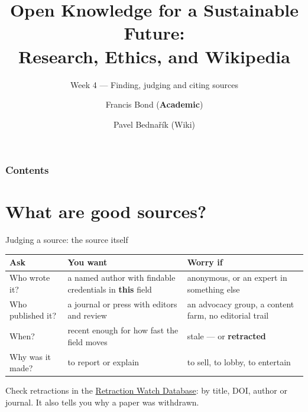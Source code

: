 \documentclass[aspectratio=169]{beamer}
\title[Sources]{Open Knowledge for a Sustainable Future:\\ Research, Ethics, and Wikipedia}
\subtitle{Week 4 --- Finding, judging and citing sources}
\author[Bond \& Bednařík]{Francis Bond (\textbf{Academic}) \and Pavel Bednařík (Wiki)}
\institute[UPOL \& Wikimedia]{Palacký University Olomouc \quad | \quad Wikimedia ČR}
\date{}
\begin{document}
\begin{frame}
  \titlepage
\end{frame}

\begin{frame}
  \frametitle{Contents}
  \small
  \tableofcontents[hideallsubsections]
\end{frame}





\section{What are good sources?}


\begin{frame}{Judging a source: the source itself}
\small
\begin{tabular}{@{}p{}p{}p{}@{}}
\toprule
\textbf{Ask} & \textbf{You want} & \textbf{Worry if} \\
\midrule
Who wrote it?      & a named author with findable credentials in \textbf{this} field
                   & anonymous, or an expert in something else \\
\addlinespace
Who published it?  & a journal or press with editors and review
                   & an advocacy group, a content farm, no editorial trail \\
\addlinespace
When?              & recent enough for how fast the field moves
                   & stale --- or \textbf{retracted} \\
\addlinespace
Why was it made?   & to report or explain
                   & to sell, to lobby, to entertain \\
\bottomrule
\end{tabular}
\vspace{1ex}

Check retractions in the \href{https://retractiondatabase.org}{Retraction Watch
Database}: by title, DOI, author or journal.  It also tells you why a
paper was withdrawn.
\end{frame}
\end{document}
